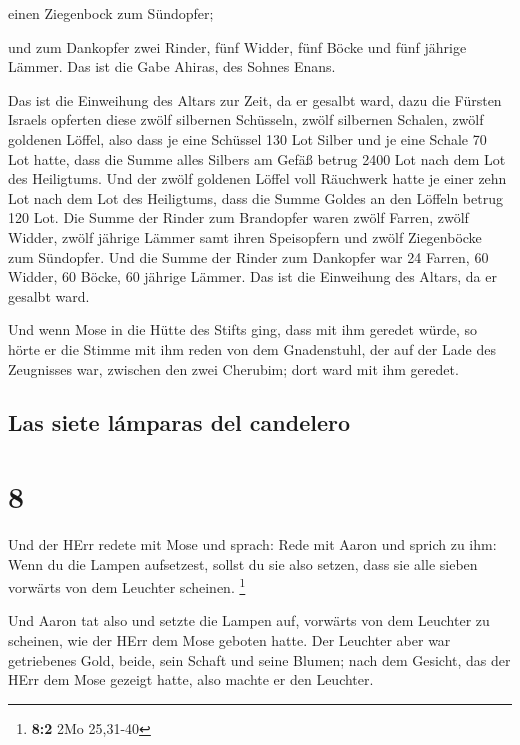  einen Ziegenbock zum Sündopfer;

 und zum Dankopfer zwei Rinder, fünf Widder, fünf Böcke
und fünf jährige Lämmer. Das ist die Gabe Ahiras, des Sohnes Enans.

 Das ist die Einweihung des Altars zur Zeit, da er
gesalbt ward, dazu die Fürsten Israels opferten diese zwölf silbernen
Schüsseln, zwölf silbernen Schalen, zwölf goldenen Löffel,
 also dass je eine Schüssel 130 Lot Silber und je eine
Schale 70 Lot hatte, dass die Summe alles Silbers am Gefäß betrug 2400
Lot nach dem Lot des Heiligtums.  Und der zwölf goldenen
Löffel voll Räuchwerk hatte je einer zehn Lot nach dem Lot des
Heiligtums, dass die Summe Goldes an den Löffeln betrug 120 Lot.
 Die Summe der Rinder zum Brandopfer waren zwölf Farren,
zwölf Widder, zwölf jährige Lämmer samt ihren Speisopfern und zwölf
Ziegenböcke zum Sündopfer.  Und die Summe der Rinder zum
Dankopfer war 24 Farren, 60 Widder, 60 Böcke, 60 jährige Lämmer. Das ist
die Einweihung des Altars, da er gesalbt ward.

 Und wenn Mose in die Hütte des Stifts ging, dass mit ihm
geredet würde, so hörte er die Stimme mit ihm reden von dem Gnadenstuhl,
der auf der Lade des Zeugnisses war, zwischen den zwei Cherubim; dort
ward mit ihm geredet.

\hypertarget{las-siete-luxe1mparas-del-candelero}{%
\subsection{Las siete lámparas del
candelero}\label{las-siete-luxe1mparas-del-candelero}}

\hypertarget{section-7}{%
\section{8}\label{section-7}}

 Und der HErr redete mit Mose und sprach: 
Rede mit Aaron und sprich zu ihm: Wenn du die Lampen aufsetzest, sollst
du sie also setzen, dass sie alle sieben vorwärts von dem Leuchter
scheinen. \footnote{\textbf{8:2} 2Mo 25,31-40}

 Und Aaron tat also und setzte die Lampen auf, vorwärts
von dem Leuchter zu scheinen, wie der HErr dem Mose geboten hatte.
 Der Leuchter aber war getriebenes Gold, beide, sein
Schaft und seine Blumen; nach dem Gesicht, das der HErr dem Mose gezeigt
hatte, also machte er den Leuchter.

